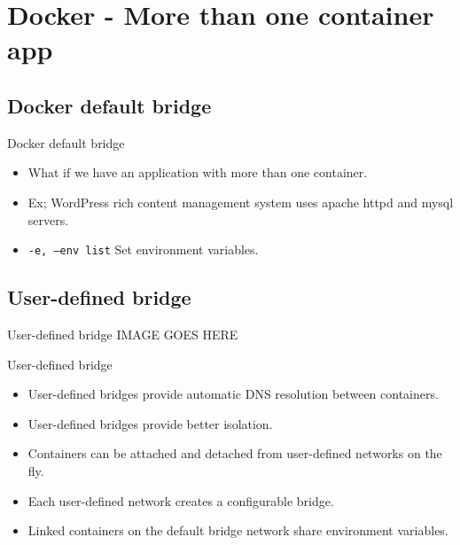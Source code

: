 

\section{Docker - More than one container app}\label{sec:more-than-one-container-app}

\subsection{Docker default bridge}\label{subsec:docker-default-bridge}
\begin{frame}{Docker default bridge}
    \begin{itemize}
        \item What if we have an application with more than one container.
        \item Ex; WordPress rich content management system uses apache httpd and mysql servers.
        \item \texttt{-e, --env list} Set environment variables.
        
    \end{itemize}
\end{frame}

\subsection{User-defined bridge}\label{subsec:user-defined-bridge}
\begin{frame}{User-defined bridge}
    IMAGE GOES HERE
\end{frame}
\begin{frame}{User-defined bridge}
    \begin{itemize}
        \item User-defined bridges provide automatic DNS resolution between containers.
        \item User-defined bridges provide better isolation.
        \item Containers can be attached and detached from user-defined networks on the fly.
        \item Each user-defined network creates a configurable bridge.
        \item Linked containers on the default bridge network share environment variables.
    \end{itemize}
\end{frame}

